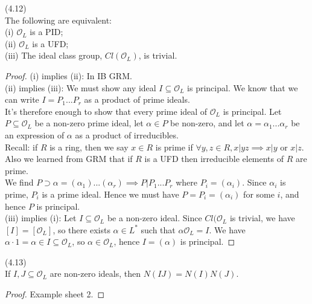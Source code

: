 \documentclass[a4paper]{article}
\begin{document}
\begin{prop} (4.12)\\
The following are equivalent:\\
(i) $\mathcal{O}_L$ is a PID;\\
(ii) $\mathcal{O}_L$ is a UFD;\\
(iii) The ideal class group, $Cl(\mathcal{O}_L)$, is trivial.
\begin{proof}
(i) implies (ii): In IB GRM.\\
(ii) implies (iii): We must show any ideal $I \subseteq \mathcal{O}_L$ is principal. We know that we can write $I=P_1...P_r$ as a product of prime ideals.\\
It's therefore enough to show that every prime ideal of $\mathcal{O}_L$ is principal. Let $P \subseteq \mathcal{O}_L$ be a non-zero prime ideal, let $\alpha \in P$ be non-zero, and let $\alpha=\alpha_1...\alpha_r$ be an expression of $\alpha$ as a product of irreducibles.\\
Recall: if $R$ is a ring, then we say $x \in R$ is prime if $\forall y,z \in R, x|yz \implies x|y$ or $x|z$. Also we learned from GRM that if $R$ is a UFD then irreducible elements of $R$ are prime.\\
We find $P \supset \alpha = (\alpha_1)...(\alpha_r) \implies P | P_1...P_r$ where $P_i = (\alpha_i)$. Since $\alpha_i$ is prime, $P_i$ is a prime ideal. Hence we must have $P=P_i = (\alpha_i)$ for some $i$, and hence $P$ is principal.\\
(iii) implies (i): Let $I \subseteq \mathcal{O}_L$ be a non-zero ideal. Since $Cl(\mathcal{O}_L$ is trivial, we have $[I] = [\mathcal{O}_L]$, so there exists $\alpha \in L^*$ such that $\alpha \mathcal{O}_L = I$. We have $\alpha \cdot 1 = \alpha \in I \subseteq \mathcal{O}_L$, so $\alpha \in \mathcal{O}_L$, hence $I=(\alpha)$ is principal.
\end{proof}
\end{prop}

\begin{lemma} (4.13)\\
If $I,J \subseteq \mathcal{O}_L$ are non-zero ideals, then $N(IJ) = N(I)N(J)$.
\begin{proof}
Example sheet 2.
\end{proof}
\end{lemma}


\iffalse
\begin{equation*}
\begin{aligned}

\end{aligned}
\end{equation*}
\fi
\end{document}
